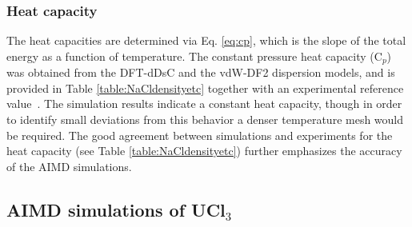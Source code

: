 \documentclass[preprint,3p,10pt,onecolumn,number,sort&compress]{elsarticle}
\begin{document}
{\subsubsection{Heat capacity} 
The heat capacities are determined via Eq. \ref{eq:cp}, which is the slope of the total energy as a function of temperature. The constant pressure heat capacity (C$_p$) was obtained from the DFT-dDsC and the vdW-DF2 dispersion models, and is provided in Table \ref{table:NaCldensityetc} together with an experimental reference value~\cite{NIST}. The simulation results indicate a constant heat capacity, though in order to identify small deviations from this behavior a denser temperature mesh would be required. The good agreement between simulations and experiments for the heat capacity (see Table \ref{table:NaCldensityetc}) further emphasizes the accuracy of the AIMD simulations.



\FloatBarrier

\subsection{AIMD simulations of UCl$_3$}
}
\end{document}
